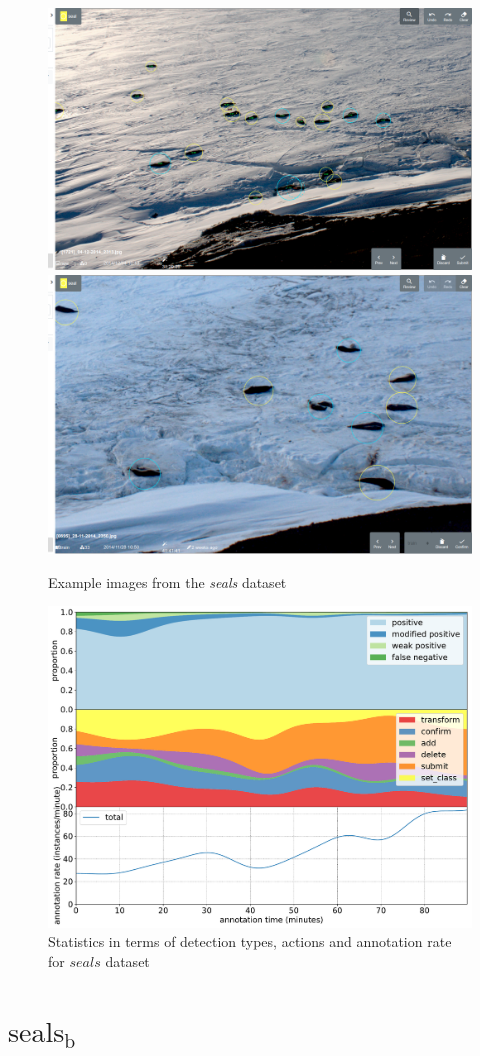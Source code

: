 \begin{figure}[!h]
\centering
  \includegraphics[width=0.475\linewidth]{figures/annotation/screenshots/seals_small2.png}
  \hfill
  \includegraphics[width=0.45\linewidth]{figures/annotation/screenshots/seals_big.png}
  \caption{}
\caption{ Example images from the \emph{seals} dataset}
\label {fig:seals_examples}
\end{figure}

\begin{figure}[!h]
\centering
\includegraphics[width=1.0\linewidth]{charts/action_annotations/seals1.pdf}
\caption{ Statistics in terms of detection types, actions and annotation rate for $seals$ dataset }
\label{fig:seals_annotation}
\end{figure}

\pagebreak
\section {$\mathrm{seals_b}$}
\label{sec:seals2_details}

